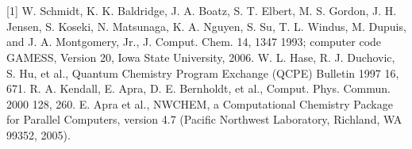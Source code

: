 \\
\vspace{0.5cm}
\\
{\footnotesize
[1] W. Schmidt, K. K. Baldridge, J. A. Boatz, S. T. Elbert, M. S. Gordon, J. H. Jensen, S. Koseki, N.
Matsunaga, K. A. Nguyen, S. Su, T. L. Windus, M. Dupuis, and J. A. Montgomery, Jr., J. Comput.
Chem. 14, 1347 1993; computer code GAMESS, Version 20, Iowa State University, 2006.
\newline
[2] W. L. Hase, R. J. Duchovic, S. Hu, et al., Quantum Chemistry Program Exchange (QCPE) Bulletin
1997 16, 671.
\newline
[3] R. A. Kendall, E. Apra, D. E. Bernholdt, et al., Comput. Phys. Commun. 2000 128, 260.
\newline
[4] E. Apra et al., NWCHEM, a Computational Chemistry Package for Parallel Computers, version
4.7 (Pacific Northwest Laboratory, Richland, WA 99352, 2005).
}


\newpage
